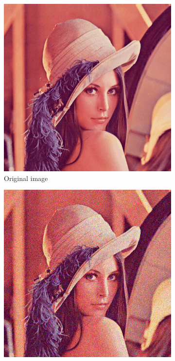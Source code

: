 \begin{figure}[h]
	\centering
	\begin{subfigure}{0.3\textwidth}
		\includegraphics[width=\textwidth]{images/noises/lenna.png}
		\caption{Original image}
	\end{subfigure}
	\begin{subfigure}{0.3\textwidth}
		\includegraphics[width=\textwidth]{images/noises/gaussian.png}

\end{subfigure}
\end{figure}
